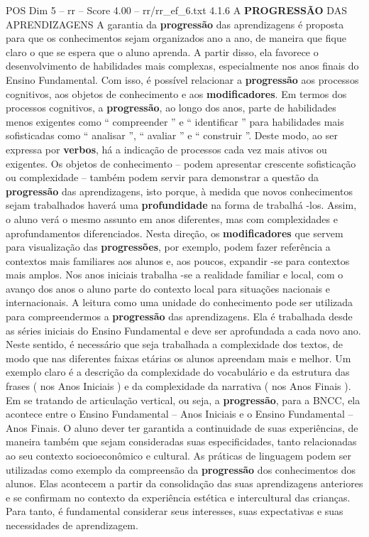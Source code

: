 \begin{textsample}{POS Dim 5 – rr – Score 4.00 – rr/rr\_ef\_6.txt}  \label{ex:f5_pos_227}
4.1.6 A \textbf{PROGRESSÃO} DAS APRENDIZAGENS A garantia da \textbf{progressão} das aprendizagens é proposta para que os conhecimentos sejam organizados ano a ano, de maneira que fique claro o que se espera que o aluno aprenda.
A partir disso, ela favorece o desenvolvimento de habilidades mais complexas, especialmente nos anos finais do Ensino Fundamental.
Com isso, é possível relacionar a \textbf{progressão} aos processos cognitivos, aos objetos de conhecimento e aos \textbf{modificadores}.
Em termos dos processos cognitivos, a \textbf{progressão}, ao longo dos anos, parte de habilidades menos exigentes como “ compreender ” e “ identificar ” para habilidades mais sofisticadas como “ analisar ”, “ avaliar ” e “ construir ”.
Deste modo, ao ser expressa por \textbf{verbos}, há a indicação de processos cada vez mais ativos ou exigentes.
Os objetos de conhecimento – podem apresentar crescente sofisticação ou complexidade – também podem servir para demonstrar a questão da \textbf{progressão} das aprendizagens, isto porque, à medida que novos conhecimentos sejam trabalhados haverá uma \textbf{profundidade} na forma de trabalhá -los.
Assim, o aluno verá o mesmo assunto em anos diferentes, mas com complexidades e aprofundamentos diferenciados.
Nesta direção, os \textbf{modificadores} que servem para visualização das \textbf{progressões}, por exemplo, podem fazer referência a contextos mais familiares aos alunos e, aos poucos, expandir -se para contextos mais amplos.
Nos anos iniciais trabalha -se a realidade familiar e local, com o avanço dos anos o aluno parte do contexto local para situações nacionais e internacionais.
A leitura como uma unidade do conhecimento pode ser utilizada para compreendermos a \textbf{progressão} das aprendizagens.
Ela é trabalhada desde as séries iniciais do Ensino Fundamental e deve ser aprofundada a cada novo ano.
Neste sentido, é necessário que seja trabalhada a complexidade dos textos, de modo que nas diferentes faixas etárias os alunos apreendam mais e melhor.
Um exemplo claro é a descrição da complexidade do vocabulário e da estrutura das frases ( nos Anos Iniciais ) e da complexidade da narrativa ( nos Anos Finais ).
Em se tratando de articulação vertical, ou seja, a \textbf{progressão}, para a BNCC, ela acontece entre o Ensino Fundamental – Anos Iniciais e o Ensino Fundamental – Anos Finais.
O aluno dever ter garantida a continuidade de suas experiências, de maneira também que sejam consideradas suas especificidades, tanto relacionadas ao seu contexto socioeconômico e cultural.
As práticas de linguagem podem ser utilizadas como exemplo da compreensão da \textbf{progressão} dos conhecimentos dos alunos.
Elas acontecem a partir da consolidação das suas aprendizagens anteriores e se confirmam no contexto da experiência estética e intercultural das crianças.
Para tanto, é fundamental considerar seus interesses, suas expectativas e suas necessidades de aprendizagem.

\end{textsample}
